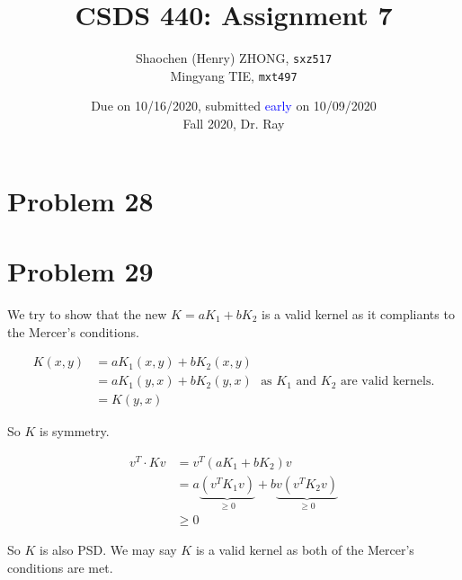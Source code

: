 \documentclass[12pt]{article}
\newcommand{\ilcode}{\texttt}
\begin{document}
\title{\textbf{CSDS 440: Assignment 7}}

\author{Shaochen (Henry) ZHONG, \ilcode{sxz517} \\ Mingyang TIE, \ilcode{mxt497}}
\date{Due on 10/16/2020, submitted \textcolor{blue}{early} on 10/09/2020 \\ Fall 2020, Dr. Ray}
\maketitle


\section{Problem 28}

\section{Problem 29}

We try to show that the new $K = aK_1 + bK_2$ is a valid kernel as it compliants to the Mercer's conditions.

\begin{align*}
    K(x, y) &= aK_1(x, y) + bK_2(x, y) \\
    &= aK_1(y, x) + bK_2(y, x) \ \ \ \text{as $K_1$ and $K_2$ are valid kernels.} \\
    &= K(y, x)
\end{align*}

So $K$ is symmetry.

\begin{align*}
    v^T \cdot K v &= v^T (aK_1 + bK_2)v \\
    &= a\underbrace{(v^T K_1 v)}_{\geq 0} + b\underbrace{v(v^T K_2 v)}_{\geq 0}  \\
    &\geq 0
\end{align*}

So $K$ is also PSD. We may say $K$ is a valid kernel as both of the Mercer's conditions are met.

\end{document}
